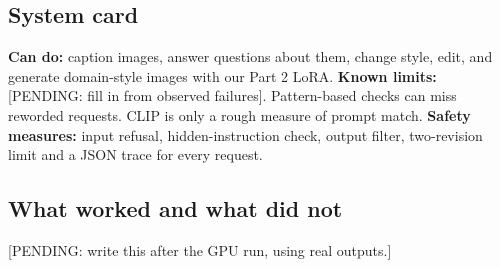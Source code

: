 \subsection{System card}
\textbf{Can do:} caption images, answer questions about them, change style, edit, and generate domain-style images with our Part 2 LoRA. \textbf{Known limits:} [PENDING: fill in from observed failures]. Pattern-based checks can miss reworded requests. CLIP is only a rough measure of prompt match. \textbf{Safety measures:} input refusal, hidden-instruction check, output filter, two-revision limit and a JSON trace for every request.

\subsection{What worked and what did not}
[PENDING: write this after the GPU run, using real outputs.]

